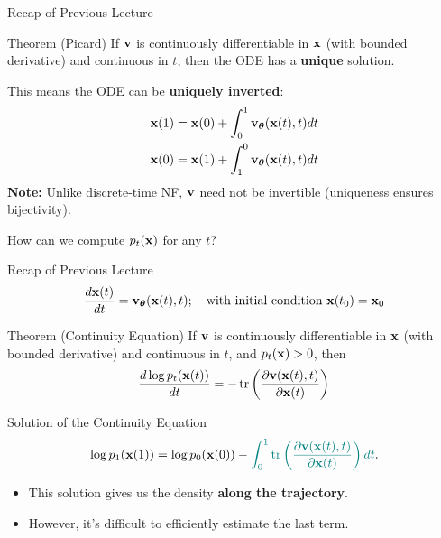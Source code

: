 \documentclass{beamer}
\begin{document}
\begin{frame}{Recap of Previous Lecture}
	\begin{block}{Theorem (Picard)}
		If $\mathbf{v}$ is continuously differentiable in $\mathbf{x}$ (with bounded derivative) and continuous in $t$, then the ODE has a \textbf{unique} solution.
	\end{block}
	This means the ODE can be \textbf{uniquely inverted}:
	\begin{align*}
		\mathbf{x}(1) &= \mathbf{x}(0) + \int_{0}^{1} \mathbf{v}_{\boldsymbol{\theta}}(\mathbf{x}(t), t) dt \\
		\mathbf{x}(0) &= \mathbf{x}(1) + \int_{1}^{0} \mathbf{v}_{\boldsymbol{\theta}}(\mathbf{x}(t), t) dt
	\end{align*}
	\textbf{Note:} Unlike discrete-time NF, $\mathbf{v}$ need not be invertible (uniqueness ensures bijectivity).
	
	How can we compute $p_t(\mathbf{x})$ for any $t$?
\end{frame}
\begin{frame}{Recap of Previous Lecture}
	\[
 		\frac{d \mathbf{x}(t)}{dt} = \mathbf{v}_{\boldsymbol{\theta}}(\mathbf{x}(t), t); \quad \text{with initial condition }\mathbf{x}(t_0) = \mathbf{x}_0
	\]
	\vspace{-0.3cm}
	\begin{block}{Theorem (Continuity Equation)}
		If $\mathbf{v}$ is continuously differentiable in $\mathbf{x}$ (with bounded derivative) and continuous in $t$, and $p_t(\mathbf{x}) > 0$, then
		\[
			\frac{d \log p_t(\mathbf{x}(t))}{d t} = - \operatorname{tr} \left( \frac{\partial \mathbf{v}(\mathbf{x}(t), t)}{\partial \mathbf{x}(t)} \right)
		\]
		\vspace{-0.5cm}
	\end{block}
	\begin{block}{Solution of the Continuity Equation}
		\vspace{-0.3cm}
		\[
			\log p_1(\mathbf{x}(1)) = \log p_0(\mathbf{x}(0)) - {\color{teal}\int_{0}^{1} \operatorname{tr}  \left( \frac{\partial \mathbf{v}(\mathbf{x}(t), t)}{\partial \mathbf{x}(t)} \right) dt}.
		\]
	\end{block}
	\begin{itemize}
		\item This solution gives us the density \textbf{along the trajectory}.
		\item However, it's difficult to efficiently estimate {\color{teal}the last term}.
	 \end{itemize}
\end{frame}
\end{document}
